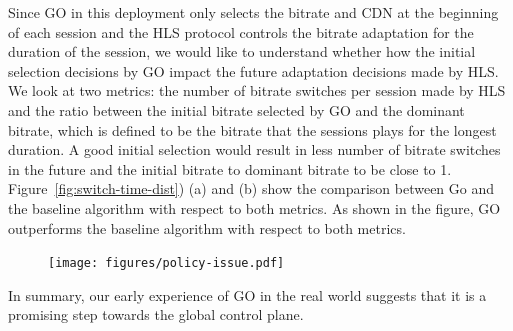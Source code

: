 Since GO in this deployment only selects the bitrate and CDN at the beginning of each session and the HLS protocol controls the bitrate adaptation for the duration of the session, we would like to understand whether how the initial selection decisions by GO impact the future adaptation decisions made by HLS. 
We look at two metrics: the number of bitrate switches per session made by HLS and the ratio between the initial bitrate selected by GO and the dominant bitrate, which is defined to be the bitrate that the sessions plays for the longest duration. A good initial selection would result in less number of bitrate switches in the future and the initial bitrate to dominant bitrate to be close to 1. 
Figure~\ref{fig:switch-time-dist}) (a) and (b) show the comparison between Go and the baseline algorithm with respect to both metrics.  As shown in the figure, GO outperforms the baseline algorithm with respect to both metrics. 



\begin{figure}[h!]
\centering
{}
\hspace{-0.6cm}
\label{fig:bitrate-stability}
\end{figure}





\begin{figure}[h!]
\centering
 \texttt{[image: figures/policy-issue.pdf]}
\tightcaption{}
\label{fig:policy}
\end{figure}


In summary, our early experience of GO in the real world suggests that it is a promising step towards the global control plane.
